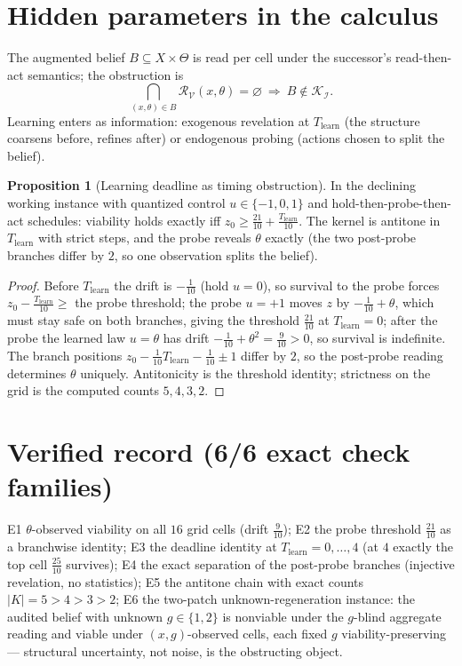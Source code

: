 \documentclass[10pt,twocolumn]{article}
\theoremstyle{definition}
\newtheorem{proposition}{Proposition}
\begin{document}
\section{Hidden parameters in the calculus}

The augmented belief $B\subseteq X\times\Theta$ is read per cell under the
successor's read-then-act semantics; the obstruction is
\begin{equation*}
\bigcap_{(x,\theta)\in B}\mathcal R_{\mathcal V}(x,\theta)=\varnothing
\ \Longrightarrow\ B\notin\mathcal K_{\mathcal I}.
\end{equation*}
Learning enters as information: exogenous revelation at $T_{\mathrm{learn}}$
(the structure coarsens before, refines after) or endogenous probing
(actions chosen to split the belief).

\begin{proposition}[Learning deadline as timing obstruction]
\label{prop:deadline}
In the declining working instance with quantized control
$u\in\{-1,0,1\}$ and hold-then-probe-then-act schedules: viability holds
exactly iff $z_0\ge\tfrac{21}{10}+\tfrac{T_{\mathrm{learn}}}{10}$. The
kernel is antitone in $T_{\mathrm{learn}}$ with strict steps, and the
probe reveals $\theta$ exactly (the two post-probe branches differ by $2$,
so one observation splits the belief).
\end{proposition}
\begin{proof}
Before $T_{\mathrm{learn}}$ the drift is $-\tfrac1{10}$ (hold $u=0$), so
survival to the probe forces $z_0-\tfrac{T_{\mathrm{learn}}}{10}\ge$ the
probe threshold; the probe $u=+1$ moves $z$ by $-\tfrac1{10}+\theta$,
which must stay safe on both branches, giving the threshold
$\tfrac{21}{10}$ at $T_{\mathrm{learn}}=0$; after the probe the learned
law $u=\theta$ has drift $-\tfrac1{10}+\theta^2=\tfrac9{10}>0$, so
survival is indefinite. The branch positions $z_0-\tfrac1{10}T_{\mathrm{
learn}}-\tfrac1{10}\pm1$ differ by $2$, so the post-probe reading
determines $\theta$ uniquely. Antitonicity is the threshold identity;
strictness on the grid is the computed counts $5,4,3,2$.
\end{proof}

\section{Verified record (6/6 exact check families)}

E1 $\theta$-observed viability on all $16$ grid cells (drift
$\tfrac9{10}$); E2 the probe threshold $\tfrac{21}{10}$ as a branchwise
identity; E3 the deadline identity at $T_{\mathrm{learn}}=0,\dots,4$
(at $4$ exactly the top cell $\tfrac{25}{10}$ survives); E4 the exact
separation of the post-probe branches (injective revelation, no
statistics); E5 the antitone chain with exact counts
$|K|=5>4>3>2$; E6 the two-patch unknown-regeneration instance: the
audited belief with unknown $g\in\{1,2\}$ is nonviable under the
$g$-blind aggregate reading and viable under $(x,g)$-observed cells,
each fixed $g$ viability-preserving --- structural uncertainty, not noise,
is the obstructing object.
\end{document}
